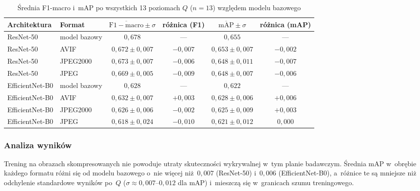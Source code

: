 \documentclass[12pt,a4paper]{article}
\begin{document}
\begin{table}[H]
\centering
\caption{Średnia F1-macro i~mAP po wszystkich 13 poziomach $Q$ ($n=13$) względem modelu bazowego}
\label{tab:exp_a_means}
\begin{tabular}{llcccc}
\toprule
Architektura & Format & $\overline{\mathrm{F1{-}macro}} \pm \sigma$ & różnica (F1) & $\overline{\mathrm{mAP}} \pm \sigma$ & różnica (mAP) \\
\midrule
ResNet-50 & model bazowy & $0{,}678$           & ---          & $0{,}655$             & --- \\
ResNet-50 & AVIF       & $0{,}672 \pm 0{,}007$ & $-0{,}007$ & $0{,}653 \pm 0{,}007$ & $-0{,}002$ \\
ResNet-50 & JPEG2000   & $0{,}673 \pm 0{,}007$ & $-0{,}006$ & $0{,}648 \pm 0{,}011$ & $-0{,}007$ \\
ResNet-50 & JPEG       & $0{,}669 \pm 0{,}005$ & $-0{,}009$ & $0{,}648 \pm 0{,}007$ & $-0{,}006$ \\
\midrule
EfficientNet-B0 & model bazowy & $0{,}628$         & ---          & $0{,}622$             & --- \\
EfficientNet-B0 &AVIF       & $0{,}632 \pm 0{,}007$ & $+0{,}003$ & $0{,}628 \pm 0{,}006$ & $+0{,}006$ \\
EfficientNet-B0 &JPEG2000   & $0{,}626 \pm 0{,}006$ & $-0{,}002$ & $0{,}625 \pm 0{,}009$ & $+0{,}003$ \\
EfficientNet-B0 &JPEG       & $0{,}618 \pm 0{,}024$ & $-0{,}010$ & $0{,}621 \pm 0{,}012$ & $0{,}000$ \\
\bottomrule
\end{tabular}
\end{table}

\subsubsection{Analiza wyników}

Trening na obrazach skompresowanych nie powoduje utraty skuteczności wykrywalnej w~tym planie badawczym. Średnia mAP w~obrębie każdego formatu różni się od modelu bazowego o~nie więcej niż~$0{,}007$ (ResNet-50) i~$0{,}006$ (EfficientNet-B0), a~różnice te są mniejsze niż odchylenie standardowe wyników po~$Q$ ($\sigma \approx 0{,}007$--$0{,}012$ dla mAP) i~mieszczą się w~granicach szumu treningowego.
\end{document}
